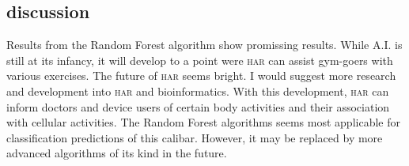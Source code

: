 \documentclass[10pt, twoside]{article}
\begin{document}
\begin{center}
\subsection{discussion}
\vspace{-3ex}
\end{center}

\noindent
Results from the Random Forest algorithm show promissing results. While A.I. is still at
its infancy, it will develop to a point were \textsc{har} can assist gym-goers with various
exercises. The future of \textsc{har} seems bright. I would suggest more research and development into
\textsc{har} and bioinformatics. With this development, \textsc{har} can inform doctors and device users
of certain body activities and their association with cellular activities. The Random Forest
algorithms seems most applicable for classification predictions of this calibar. However, it
may be replaced by more advanced algorithms of its kind in the future.
\end{document}
